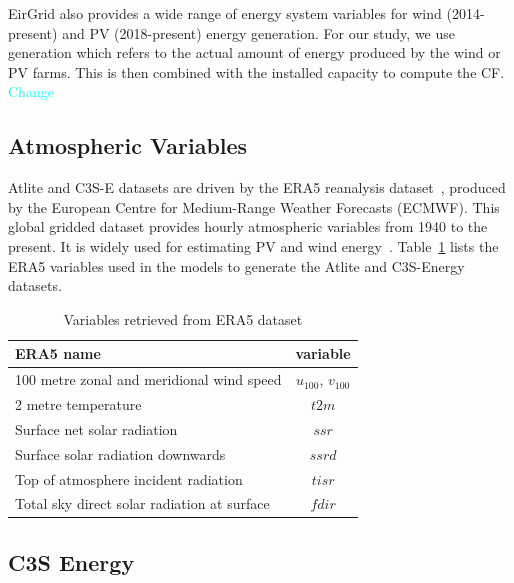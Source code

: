 \documentclass[a4paper, 11pt]{article}
\begin{document}
EirGrid also provides a wide range of energy system variables for wind (2014-present) and PV (2018-present) energy generation. For our study, we use generation which refers to the actual amount of energy produced by the wind or PV farms. This is then combined with the installed capacity to compute the CF. \textcolor{cyan}{Change}

\subsection{Atmospheric Variables}
\label{sec:era5}
 
Atlite and C3S-E datasets are driven by the ERA5 reanalysis dataset~\cite{hersbach2020era5}, produced by the European Centre for Medium-Range Weather Forecasts (ECMWF). This global gridded dataset provides hourly atmospheric variables from 1940 to the present. It is widely used for estimating PV and wind energy~\cite{mockert2023drought, dubus2023energy, brown2021drought, otero2022drought}. Table~\ref{tab:var_name} lists the ERA5 variables used in the models to generate the Atlite and C3S-Energy datasets.

\begin{table}[h!]
	\centering
	\begin{tabular}{|l|c|}
		\hline
		{\textbf{ERA5 name}}      & \textbf{variable} \\ \hline
		100 metre zonal and meridional wind speed   & $u_{100}$, $v_{100}$ \\
		2 metre temperature                         & $t2m$ \\
		Surface net solar radiation                 & $ssr$ \\
		Surface solar radiation downwards           & $ssrd$  \\
		Top of atmosphere incident radiation        & $tisr$  \\
		Total sky direct solar radiation at surface & $fdir$  \\ \hline
	\end{tabular}
	\caption{Variables retrieved from ERA5 dataset}
	\label{tab:var_name}
\end{table}

\subsection{C3S Energy}
\label{sec:c3se}
\end{document}
